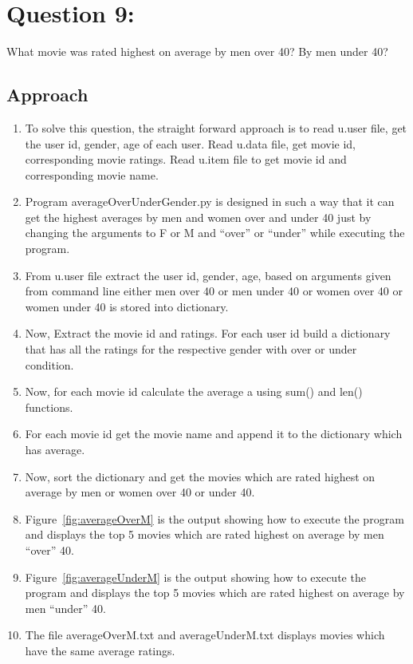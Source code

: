\documentclass[12pt]{article}
\begin{document}
\section{Question 9:}
What movie was rated highest on average by men over 40? By men
under 40?
\subsection{Approach}
\begin{enumerate}
\item To solve this question, the straight forward approach is to read u.user file, get the user id, gender, age of each user. Read u.data file, get movie id, corresponding movie ratings. Read u.item file to get movie id and corresponding movie name.
	\item Program averageOverUnderGender.py is designed in  such a way that it can get the highest averages by men and women over and under 40 just by changing the arguments to F or M  and ``over'' or ``under'' while executing the program.	
	\item From u.user file extract the user id, gender, age,  based on arguments given from command line either men over 40 or men under 40 or women over 40 or women under 40 is stored into dictionary.     
    \item Now, Extract the movie id and ratings. For each user id build a dictionary that has all the ratings for the respective gender with over or under condition.
    \item Now, for each movie id calculate the average a using sum() and len() functions.
    \item For each movie id get the movie name and append it to the dictionary which has average.
    \item Now, sort the dictionary and get the movies which are rated highest on average by men or women over 40 or under 40.
    \item  Figure~\ref{fig:averageOverM} is the output showing how to execute the program and displays the top 5 movies which are rated highest on average by men ``over'' 40.
    \item  Figure~\ref{fig:averageUnderM} is the output showing how to execute the program and displays the top 5 movies which are rated highest on average by men ``under'' 40.
    \item  The file averageOverM.txt and averageUnderM.txt displays movies which have the same average ratings.     
     
\end{enumerate}
\end{document}
